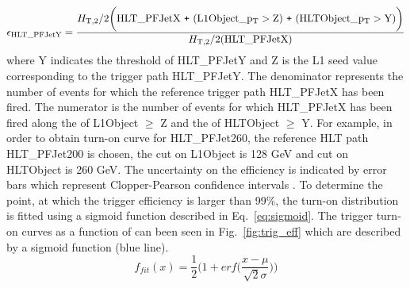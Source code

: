 \begin{equation}
 \label{eq:eff}
 {\rm \epsilon_{HLT\_PFJetY}} = \frac{\httwo {\rm \bigg(HLT\_PFJetX~\plus (L1Object\_\pt > Z)~\plus (HLTObject\_\pt > Y)\bigg)}}{\httwo {\rm (HLT\_PFJetX)}}
\end{equation}
where Y indicates the \pt threshold of HLT\_PFJetY and Z is the L1 seed value corresponding to the trigger path HLT\_PFJetY. The denominator represents the number of events for which the reference trigger path HLT\_PFJetX has been fired. The numerator is the number of events for which HLT\_PFJetX has been fired along the \pt of L1Object $\geq$ Z and the \pt of HLTObject $\geq$ Y. For example, in order to obtain turn-on curve for HLT\_PFJet260, the reference HLT path HLT\_PFJet200 is chosen, the \pt cut on L1Object is 128 GeV and \pt cut on HLTObject is 260 GeV. The uncertainty on the efficiency is indicated by error bars which represent Clopper-Pearson confidence intervals \cite{10.2307/2331986}. To determine the point, at which the trigger efficiency is larger than 99\%, the turn-on distribution is fitted using a sigmoid function described in Eq.~\ref{eq:sigmoid}. The trigger turn-on curves as a function of \httwo can been seen in Fig.~\ref{fig:trig_eff} which are described by a sigmoid function (blue line).
\begin{equation}
 \label{eq:sigmoid}
  f_{fit} (x) = \frac {1}{2} \Bigg( 1 ~\texttt{+}~ erf \Big(\frac {x - \mu}{\sqrt{2} \sigma} \Big) \Bigg)
\end{equation}

